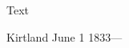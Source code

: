 			
			\begin{description}
				\item[Text]
			\end{description}
				
				\begin{tightcenter}
				Kirtland June 1 1833---
				\end{tightcenter}
				
